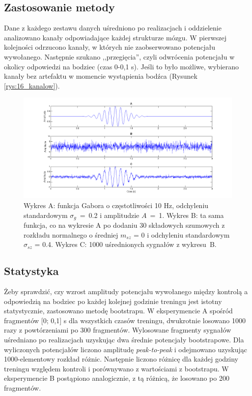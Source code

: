 \documentclass{pracamgr}
\begin{document}
	\subsection{Zastosowanie metody}\label{sec:zast_pot}
	Dane z każdego zestawu danych uśredniono po realizacjach i oddzielenie analizowano kanały odpowiadające każdej strukturze mózgu. W pierwszej kolejności odrzucono kanały, w których nie zaobserwowano potencjału wywołanego. Następnie szukano ,,przegięcia'', czyli odwrócenia potencjału w okolicy odpowiedzi na bodziec (czas 0-0,1 s). Jeśli to było możliwe, wybierano kanały bez artefaktu w momencie wystąpienia bodźca (Rysunek \ref{rys:16_kanalow}).
	\begin{figure}[h]
		\begin{center}
			\includegraphics[scale = 0.7]{gabor.png}
		\end{center}
		\caption{Wykres A: funkcja Gabora o częstotliwości 10 Hz, odchyleniu standardowym $\sigma_g$~=~0.2 i amplitudzie $A$~=~1. Wykres B: ta sama funkcja, co na wykresie A po dodaniu 30 składowych szumowych z rozkładu normalnego o średniej $m_{sz}$ = 0 i odchyleniu standardowym $\sigma_{sz}$ = 0.4. Wykres C: 1000 uśrednionych sygnałów z wykresu~B.}
		\label{rys:gabor}
	\end{figure}
	\newpage
	\subsection{Statystyka}\label{statystyka}
	Żeby sprawdzić, czy wzrost amplitudy potencjału wywołanego między kontrolą a odpowiedzią na bodziec po każdej kolejnej godzinie treningu jest istotny statystycznie, zastosowano metodę bootstrapu. W eksperymencie A spośród fragmentów [0; 0,1] s dla wszystkich czasów treningu, dwukrotnie losowano 1000 razy z powtórzeniami po 300 fragmentów. Wylosowane fragmenty sygnałów uśredniano po realizacjach uzyskując dwa średnie potencjały bootstrapowe. Dla wyliczonych potencjałów liczono amplitudę \emph{peak-to-peak} i odejmowano uzyskując 1000-elementowy rozkład różnic. Następnie liczono różnicę dla każdej godziny treningu względem kontroli i porównywano z wartościami z bootstrapu. W eksperymencie B postąpiono analogicznie, z tą różnicą, że losowano po 200 fragmentów.
	
\end{document}
